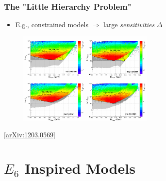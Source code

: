 \documentclass[10pt,aspectratio=169]{beamer}
\begin{document}
\begin{frame}
  \frametitle{The "Little Hierarchy Problem"}
  \begin{itemize}
    \item E.g., constrained models $\Rightarrow$ large \emph{sensitivities}
      $\Delta$
  \end{itemize}
  \begin{figure}
    \includegraphics[width=0.6\textwidth]{mssm_higgs_tuning}
  \end{figure}
  \vspace*{-10pt}
  \begin{center}
    {\tiny [\href{https://arxiv.org/abs/1203.0569v2}{arXiv:1203.0569}]}
  \end{center}
\end{frame}

\section{$E_6$ Inspired Models}
\end{document}
